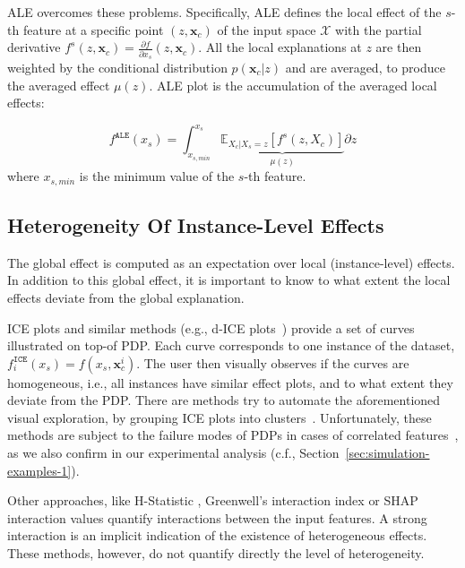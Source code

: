 \documentclass[twoside]{article}
\newcommand{\xc}{\mathbf{x}_c}
\begin{document}
ALE overcomes these problems. Specifically, ALE defines the local
effect of the \(s\)-th feature at a specific point \((z, \xc)\) of the
input space \(\mathcal{X}\) with the partial derivative
\(f^s(z, \xc) = \frac{\partial f}{\partial x_s} (z, \xc)\). All the
local explanations at \(z\) are then weighted by the conditional
distribution \(p(\xc|z)\) and are averaged, to produce the averaged
effect \(\mu(z)\). ALE plot is the accumulation of the averaged local
effects:

\begin{equation}
  \label{eq:ALE}
  f^{\mathtt{ALE}}(x_s) = \int_{x_{s,min}}^{x_s} \underbrace{\mathbb{E}_{X_c|X_s=z}\left [f^s (z, X_c)\right ]}_{\mu(z)} \partial z
\end{equation}
%
where \(x_{s,min}\) is the minimum value of the \(s\)-th feature.

\subsection{Heterogeneity Of Instance-Level Effects}
\label{sec:quant-heter-effects}

The global effect is computed as an expectation over local
(instance-level) effects. In addition to this global effect, it is
important to know to what extent the local effects deviate from the
global explanation. 

ICE plots and similar methods (e.g., d-ICE
plots~\citep{goldstein2015peeking}) provide a set of curves
illustrated on top-of PDP. Each curve corresponds to one instance of
the dataset, \(f^{\mathtt{ICE}}_i(x_s) = f(x_s, \xc^i)\). The user
then visually observes if the curves are homogeneous, i.e., all
instances have similar effect plots, and to what extent they deviate
from the PDP. There are methods try to automate the aforementioned
visual exploration, by grouping ICE plots into
clusters~\citep{molnar2020model, herbinger2022repid,
  britton2019vine}. Unfortunately, these methods are subject to the
failure modes of PDPs in cases of correlated
features~\citep{baniecki2021fooling}, as we also confirm in our
experimental analysis (c.f., Section~\ref{sec:simulation-examples-1}).

Other approaches, like H-Statistic \citep{friedman2008predictive},
Greenwell's interaction index \citep{greenwell2018simple} or SHAP
interaction values \citep{lundberg2018consistent} quantify
interactions between the input features. A strong interaction is
  an implicit indication of the existence of heterogeneous effects. These
  methods, however, do not quantify directly the level of heterogeneity.
\end{document}
